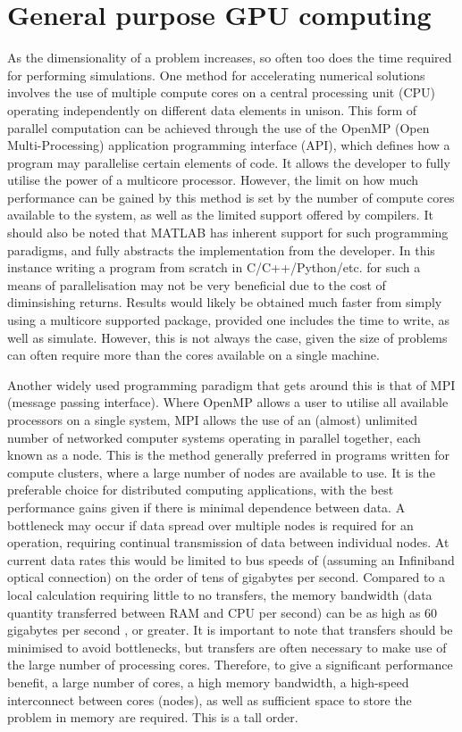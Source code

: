 \section{General purpose GPU computing}

As the dimensionality of a problem increases, so often too does the time required for performing simulations. One method for accelerating numerical solutions involves the use of multiple compute cores on a central processing unit (CPU) operating independently on different data elements in unison. This form of parallel computation can be achieved through the use of the OpenMP (Open Multi-Processing) application programming interface (API), which defines how a program may parallelise certain elements of code. It allows the developer to fully utilise the power of a multicore processor. However, the limit on how much performance can be gained by this method is set by the number of compute cores available to the system, as well as the limited support offered by compilers. It should also be noted that MATLAB has inherent support for such programming paradigms, and fully abstracts the implementation from the developer. In this instance writing a program from scratch in C/C++/Python/etc. for such a means of parallelisation may not be very beneficial due to the cost of diminsishing returns. Results would likely be obtained much faster from simply using a multicore supported package, provided one includes the time to write, as well as simulate. However, this is not always the case, given the size of problems can often require more than the cores available on a single machine.

Another widely used programming paradigm that gets around this is that of MPI (message passing interface). Where OpenMP allows a user to utilise all available processors on a single system, MPI allows the use of an (almost) unlimited number of networked computer systems operating in parallel together, each known as a node. This is the method generally preferred in programs written for compute clusters, where a large number of nodes are available to use. It is the preferable choice for distributed computing applications, with the best performance gains given if there is minimal dependence between data. A bottleneck may occur if data spread over multiple nodes is required for an operation, requiring continual transmission of data between individual nodes. At current data rates this would be limited to bus speeds of (assuming an Infiniband optical connection) on the order of tens of gigabytes per second. Compared to a local calculation requiring little to no transfers, the memory bandwidth (data quantity transferred between RAM and CPU per second) can be as high as 60 gigabytes per second \cite{DAT:Intel_xeon}, or greater. It is important to note that transfers should be minimised to avoid bottlenecks, but transfers are often necessary to make use of the large number of processing cores. Therefore, to give a significant performance benefit, a large number of cores, a high memory bandwidth, a high-speed interconnect between cores (nodes), as well as sufficient space to store the problem in memory are required. This is a tall order.

